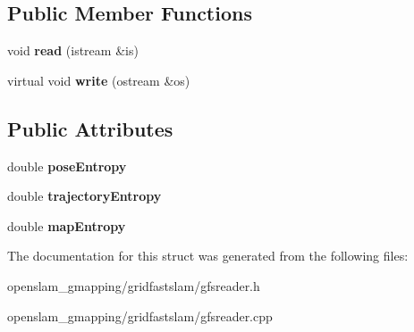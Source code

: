 \subsection*{Public Member Functions}
\begin{DoxyCompactItemize}
\item 
\mbox{\label{structGMapping_1_1GFSReader_1_1EntropyRecord_ae4583ee83bd9bdc733c4fdf85212f828}} 
void {\bfseries read} (istream \&is)
\item 
\mbox{\label{structGMapping_1_1GFSReader_1_1EntropyRecord_a3a629cf4f2d3c03ff71408a9c31d1365}} 
virtual void {\bfseries write} (ostream \&os)
\end{DoxyCompactItemize}
\subsection*{Public Attributes}
\begin{DoxyCompactItemize}
\item 
\mbox{\label{structGMapping_1_1GFSReader_1_1EntropyRecord_a6f6055931dc75a6badf3933d632fca30}} 
double {\bfseries pose\+Entropy}
\item 
\mbox{\label{structGMapping_1_1GFSReader_1_1EntropyRecord_abf160adeba0913da8749bed89fd2c37c}} 
double {\bfseries trajectory\+Entropy}
\item 
\mbox{\label{structGMapping_1_1GFSReader_1_1EntropyRecord_a36d9162b4143d0888f6c1c35d5256208}} 
double {\bfseries map\+Entropy}
\end{DoxyCompactItemize}


The documentation for this struct was generated from the following files\+:\begin{DoxyCompactItemize}
\item 
openslam\+\_\+gmapping/gridfastslam/gfsreader.\+h\item 
openslam\+\_\+gmapping/gridfastslam/gfsreader.\+cpp\end{DoxyCompactItemize}
